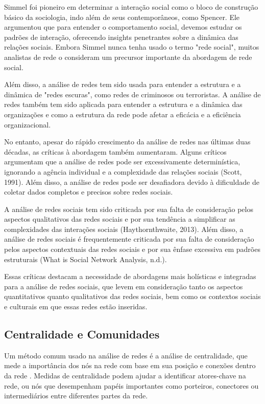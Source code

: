 Simmel foi pioneiro em determinar a interação social como o bloco de construção básico da sociologia, indo além de seus contemporâneos, como Spencer. Ele argumentou que para entender o comportamento social, devemos estudar os padrões de interação, oferecendo insights penetrantes sobre a dinâmica das relações sociais. Embora Simmel nunca tenha usado o termo "rede social", muitos analistas de rede o consideram um precursor importante da abordagem de rede social.

Além disso, a análise de redes tem sido usada para entender a estrutura e a dinâmica de "redes escuras", como redes de criminosos ou terroristas. A análise de redes também tem sido aplicada para entender a estrutura e a dinâmica das organizações e como a estrutura da rede pode afetar a eficácia e a eficiência organizacional.

No entanto, apesar do rápido crescimento da análise de redes nas últimas duas décadas, as críticas à abordagem também aumentaram. Alguns críticos argumentam que a análise de redes pode ser excessivamente determinística, ignorando a agência individual e a complexidade das relações sociais (Scott, 1991). Além disso, a análise de redes pode ser desafiadora devido à dificuldade de coletar dados completos e precisos sobre redes sociais.

A análise de redes sociais tem sido criticada por sua falta de consideração pelos aspectos qualitativos das redes sociais e por sua tendência a simplificar as complexidades das interações sociais (Haythornthwaite, 2013). Além disso, a análise de redes sociais é frequentemente criticada por sua falta de consideração pelos aspectos contextuais das redes sociais e por sua ênfase excessiva em padrões estruturais (What is Social Network Analysis, n.d.).

Essas críticas destacam a necessidade de abordagens mais holísticas e integradas para a análise de redes sociais, que levem em consideração tanto os aspectos quantitativos quanto qualitativos das redes sociais, bem como os contextos sociais e culturais em que essas redes estão inseridas.

\subsection{Centralidade e Comunidades}

Um método comum usado na análise de redes é a análise de centralidade, que mede a importância dos nós na rede com base em sua posição e conexões dentro da rede \cite[]{1978_Freeman}. Medidas de centralidade podem ajudar a identificar atores-chave na rede, ou nós que desempenham papéis importantes como porteiros, conectores ou intermediários entre diferentes partes da rede.

